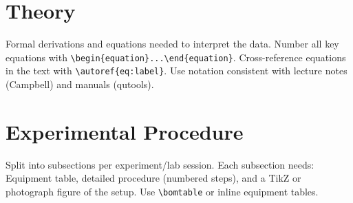 \documentclass[aps,prl,twocolumn,10pt,superscriptaddress]{revtex4-2}
\begin{document}
\section{Theory}
\label{sec:theory}

\begin{guidance}
Formal derivations and equations needed to interpret the data.
Number all key equations with \verb|\begin{equation}...\end{equation}|.
Cross-reference equations in the text with \verb|\autoref{eq:label}|.
Use notation consistent with lecture notes (Campbell) and manuals (qutools).
\end{guidance}


\section{Experimental Procedure}

\begin{guidance}
Split into subsections per experiment/lab session.
Each subsection needs: Equipment table, detailed procedure (numbered steps),
and a TikZ or photograph figure of the setup.
Use \verb|\bomtable| or inline equipment tables.
\end{guidance}



\end{document}
